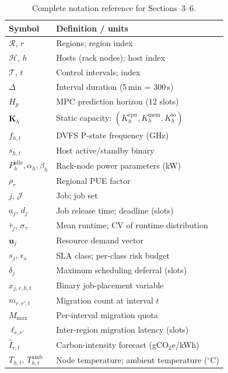 \documentclass[a4paper,fleqn]{cas-dc}
\begin{document}
\begin{table}[!htb]
\centering
\caption{Complete notation reference for Sections~3--6.}
\label{tab:app_notation}
\footnotesize
\setlength{\tabcolsep}{6pt}
\renewcommand{\arraystretch}{1.2}
\begin{tabular}{>{\bfseries}p{3.2cm} p{5.0cm}}
\toprule
\normalfont\textbf{Symbol} & \textbf{Definition / units} \\
\midrule
\rowcolor{black!5}$\mathcal{R},\,r$ & Regions; region index \\
$\mathcal{H},\,h$ & Hosts (rack nodes); host index \\
\rowcolor{black!5}$\mathcal{T},\,t$ & Control intervals; index \\
$\Delta$ & Interval duration (5\,min = 300\,s) \\
\rowcolor{black!5}$H_p$ & MPC prediction horizon (12 slots) \\
$\mathbf{K}_h$ & Static capacity: $(K^{\mathrm{cpu}}_h, K^{\mathrm{mem}}_h, K^{\mathrm{io}}_h)$ \\
\rowcolor{black!5}$f_{h,t}$ & DVFS P-state frequency (GHz) \\
$s_{h,t}$ & Host active/standby binary \\
\rowcolor{black!5}$P^{\mathrm{idle}}_h,\alpha_h,\beta_h$ & Rack-node power parameters (kW) \\
$\rho_r$ & Regional PUE factor \\
\rowcolor{black!5}$j,\,\mathcal{J}$ & Job; job set \\
$a_j,\,d_j$ & Job release time; deadline (slots) \\
\rowcolor{black!5}$\bar{\tau}_j,\,\sigma_\tau$ & Mean runtime; CV of runtime distribution \\
$\mathbf{u}_j$ & Resource demand vector \\
\rowcolor{black!5}$s_j,\,\epsilon_s$ & SLA class; per-class risk budget \\
$\delta_j$ & Maximum scheduling deferral (slots) \\
\rowcolor{black!5}$x_{j,r,h,t}$ & Binary job-placement variable \\
$m_{r,r',t}$ & Migration count at interval $t$ \\
\rowcolor{black!5}$M_{\max}$ & Per-interval migration quota \\
$\ell_{r,r'}$ & Inter-region migration latency (slots) \\
\rowcolor{black!5}$\hat{I}_{r,t}$ & Carbon-intensity forecast (gCO$_2$e/kWh) \\
$T_{h,t},\,T^{\mathrm{amb}}_{h,t}$ & Node temperature; ambient temperature ($^\circ$C) \\

\end{tabular}
\end{table}
\end{document}

